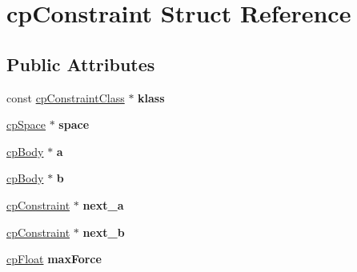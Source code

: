 \hypertarget{structcp_constraint}{}\section{cp\+Constraint Struct Reference}
\label{structcp_constraint}
\subsection*{Public Attributes}
\begin{DoxyCompactItemize}
\item 
\mbox{\label{structcp_constraint_af34bbdbca29e0661efb022f106080301}} 
const \mbox{\hyperlink{structcp_constraint_class}{cp\+Constraint\+Class}} $\ast$ {\bfseries klass}
\item 
\mbox{\label{structcp_constraint_ad0210f420d9ba931e614e02fa16a6d29}} 
\mbox{\hyperlink{structcp_space}{cp\+Space}} $\ast$ {\bfseries space}
\item 
\mbox{\label{structcp_constraint_a5740b2723545d943c2f45263e27fb9dd}} 
\mbox{\hyperlink{structcp_body}{cp\+Body}} $\ast$ {\bfseries a}
\item 
\mbox{\label{structcp_constraint_a6535c08469cbed91a28ae36aa2e40f89}} 
\mbox{\hyperlink{structcp_body}{cp\+Body}} $\ast$ {\bfseries b}
\item 
\mbox{\label{structcp_constraint_a1cfdb09c3bd7645d8d1b988bd08f3e31}} 
\mbox{\hyperlink{structcp_constraint}{cp\+Constraint}} $\ast$ {\bfseries next\+\_\+a}
\item 
\mbox{\label{structcp_constraint_a85b2d9ffa8c01b1d9800c87cd04bcee3}} 
\mbox{\hyperlink{structcp_constraint}{cp\+Constraint}} $\ast$ {\bfseries next\+\_\+b}
\item 
\mbox{\label{structcp_constraint_a993d4e5c9439d7b913bd391e955e0e5b}} 
\mbox{\hyperlink{group__basic_types_gac1ed65573e035bf892505768c852d8d3}{cp\+Float}} {\bfseries max\+Force}
\item 
\mbox{\label{structcp_constraint_a4cfd0b995f500090fc5811635ed57614}} 

\end{DoxyCompactItemize}
